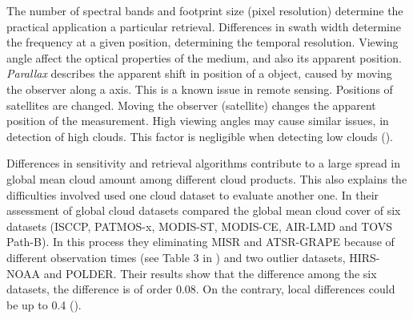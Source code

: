 The number of spectral bands and footprint size (pixel resolution) determine the practical application a particular retrieval. Differences in swath width determine the frequency at a given position, determining the temporal resolution. Viewing angle affect the optical properties of the medium, and also its apparent position. \textit{Parallax} describes the apparent shift in position of a object, caused by moving the observer along a axis. This is a known issue in remote sensing. Positions of satellites are changed. Moving the observer (satellite) changes the apparent position of the measurement. 
High viewing angles may cause similar issues, in detection of high clouds. This factor is negligible when detecting low clouds (\cite{Joro2010ComparisonFinland}). 

Differences in sensitivity and retrieval algorithms contribute to a large spread in global mean cloud amount among different cloud products. This also explains the difficulties involved used one cloud dataset to evaluate another one. In their assessment of global cloud datasets  compared the global mean cloud cover of six datasets (ISCCP, PATMOS-x, MODIS-ST, MODIS-CE, AIR-LMD and TOVS Path-B). In this process they eliminating MISR and ATSR-GRAPE because of different observation times (see Table 3 in  ) and two outlier datasets, HIRS-NOAA and POLDER. Their results show that the difference among the six datasets, the difference is of order 0.08. On the contrary, local differences could be up to 0.4 (\cite{Stubenrauch2013AssessmentPanel}). 


